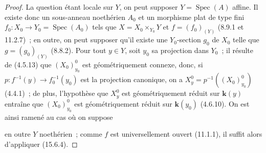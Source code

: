 \begin{proof}
La question étant locale sur $Y$, on peut supposer $Y=\operatorname{Spec}(A)$ affine. Il existe donc un sous-anneau noethérien $A_0$ et un morphisme plat de type fini $f_0:X_0\to Y_0=\operatorname{Spec}(A_0)$ tels que $X=X_0\times_{Y_0}Y$ et $f=(f_0)_{(Y)}$ (8.9.1 et 11.2.7)~; en outre, on peut supposer qu'il existe une $Y_0$-section $g_0$ de $X_0$ telle que $g=(g_0)_{(Y)}$ (8.8.2). Pour tout $y\in Y$, soit $y_0$ sa projection dans $Y_0$~; il résulte de (4.5.13) que $(X_0)_{y_0}^0$ est géométriquement connexe, donc, si $p:f^{-1}(y)\to f_0^{-1}(y_0)$ est la projection canonique, on a $X_y^0=p^{-1}((X_0)_{y_0}^0)$ (4.4.1)~; de plus, l'hypothèse que $X_y^0$ est géométriquement réduit sur $\mathbf{k}(y)$ entraîne que $(X_0)_{y_0}^0$ est géométriquement réduit sur $\mathbf{k}(y_0)$ (4.6.10). On est ainsi ramené au cas où on suppose

en outre $Y$ noethérien~; comme $f$ est universellement ouvert (11.1.1), il suffit alors d'appliquer (15.6.4).
\end{proof}

